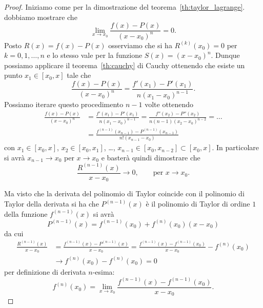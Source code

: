 \begin{proof}
\mymark{**}
Iniziamo come per la dimostrazione del teorema~\ref{th:taylor_lagrange}.
dobbiamo
mostrare che
\[
  \lim_{x\to x_0} \frac{f(x)- P(x)}{(x-x_0)^n} = 0.
\]
Posto $R(x) = f(x)-P(x)$
osserviamo che si ha $R^{(k)}(x_0) =  0$ per $k=0,1, \dots, n$
e lo stesso vale per la funzione $S(x) = (x-x_0)^n$.
Dunque possiamo applicare il teorema~\ref{th:cauchy} di Cauchy ottenendo
che esiste un punto $x_1\in[x_0,x]$ tale che
\[
  \frac{f(x)-P(x)}{(x-x_0)^n} = \frac{f'(x_1)-P'(x_1)}{n(x_1-x_0)^{n-1}}.
\]
Possiamo iterare questo procedimento $n-1$ volte
ottenendo
\begin{align*}
  \frac{f(x) - P(x)}{(x-x_0)^n}
  &= \frac{f'(x_1)-P'(x_1)}{n(x_1-x_0)^{n-1}}
  = \frac{f''(x_2)-P''(x_2)}{n(n-1)(x_2-x_0)^{n-2}}
  = \dots \\
  &= \frac{f^{(n-1)}(x_{n-1}) - P^{(n-1)}(x_{n-1})}{n!(x_{n-1}-x_0)}
\end{align*}
con $x_1 \in [x_0,x]$, $x_2\in [x_0,x_1]$, \dots, $x_{n-1} \in [x_0,x_{n-2}]\subset[x_0,x]$.
In particolare si avrà $x_{n-1}\to x_0$ per $x\to x_0$ e basterà
quindi dimostrare che
\[
\frac{R^{(n-1)}(x)}{x-x_0} \to 0, \qquad \text{per $x\to x_0$}.
\]

Ma visto che la derivata del polinomio di Taylor coincide con il
polinomio di Taylor della derivata si ha che $P^{(n-1)}(x)$
è il polinomio di Taylor di ordine $1$ della funzione $f^{(n-1)}(x)$
si avrà
\[
  P^{(n-1)} (x) = f^{(n-1)}(x_0) + f^{(n)}(x_0) (x-x_0)
\]
da cui
\begin{align*}
\frac{R^{(n-1)}(x)}{x-x_0}
&= \frac{f^{(n-1)}(x) - P^{(n-1)}(x)}{x-x_0}
= \frac{f^{(n-1)}(x) - f^{(n-1)}(x_0)}{x-x_0} - f^{(n)}(x_0)\\
&\to f^{(n)}(x_0) - f^{(n)}(x_0)
 = 0
\end{align*}
per definizione di derivata $n$-esima:
\[
  f^{(n)}(x_0) = \lim_{x\to x_0} \frac{f^{(n-1)}(x)-f^{(n-1)}(x_0)}{x-x_0}.
\]


\end{proof}
